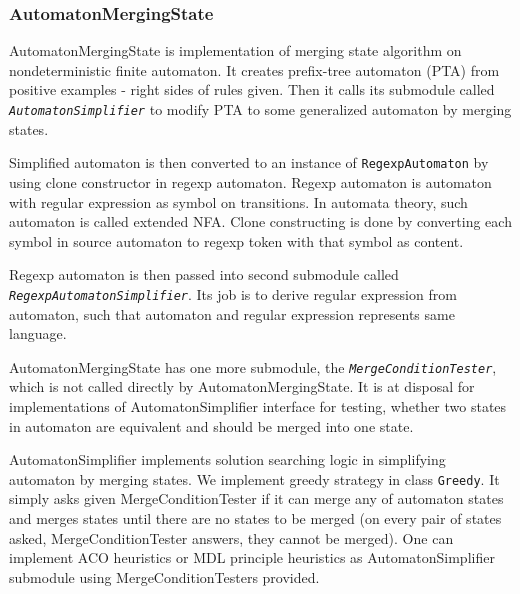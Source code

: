 \documentclass[a4paper,10pt,oneside]{article}
\newcommand{\code}[1]{\texttt{#1}}
\newcommand{\jmodule}[1]{\texttt{\textsl{#1}}}
\begin{document}
\subsubsection{AutomatonMergingState}
AutomatonMergingState is implementation of merging state algorithm on nondeterministic finite automaton.
It creates prefix-tree automaton (PTA) from positive examples - right sides of rules given.
Then it calls its submodule called \jmodule{AutomatonSimplifier} to  modify PTA to some generalized 
automaton by merging states.

Simplified automaton is then converted to an instance of \code{RegexpAutomaton} by using clone constructor in regexp automaton.
Regexp automaton is automaton with regular expression as symbol on transitions.
In automata theory, such automaton is called extended NFA.
Clone constructing is done by converting each symbol in source automaton to regexp token with that symbol as content.

Regexp automaton is then passed into second submodule called \jmodule{RegexpAutomatonSimplifier}.
Its job is to derive regular expression from automaton, such that automaton and regular expression represents same language.

AutomatonMergingState has one more submodule, the \jmodule{MergeConditionTester}, which is not called directly by AutomatonMergingState.
It is at disposal for implementations of AutomatonSimplifier interface for testing, whether two states in automaton are equivalent and should be merged into one state.

AutomatonSimplifier implements solution searching logic in simplifying automaton by merging states.
We implement greedy strategy in class \code{Greedy}.
It simply asks given MergeConditionTester if it can merge any of automaton states and merges states until there are no states to be merged (on every pair of states asked, MergeConditionTester answers, they cannot be merged).
One can implement ACO heuristics or MDL principle heuristics as AutomatonSimplifier submodule using MergeConditionTesters provided.
\end{document}
